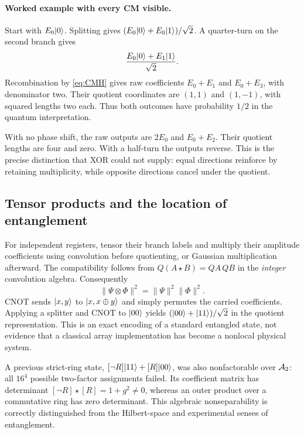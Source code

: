 \paragraph{Worked example with every CM visible.}
Start with $E_0\lvert 0\rangle$. Splitting gives $(E_0\lvert 0\rangle+E_0\lvert 1\rangle)/\sqrt2$. A quarter-turn on the second branch gives
\begin{equation}
 \frac{E_0\lvert 0\rangle+E_1\lvert 1\rangle}{\sqrt2}.
\end{equation}
Recombination by \cref{eq:CMH} gives raw coefficients $E_0+E_1$ and $E_0+E_3$, with denominator two. Their quotient coordinates are $(1,1)$ and $(1,-1)$, with squared lengths two each. Thus both outcomes have probability $1/2$ in the quantum interpretation.

With no phase shift, the raw outputs are $2E_0$ and $E_0+E_2$. Their quotient lengths are four and zero. With a half-turn the outputs reverse. This is the precise distinction that XOR could not supply: equal directions reinforce by retaining multiplicity, while opposite directions cancel under the quotient.

\subsection{Tensor products and the location of entanglement}
For independent registers, tensor their branch labels and multiply their amplitude coefficients using convolution before quotienting, or Gaussian multiplication afterward. The compatibility follows from $Q(A\star B)=QA\,QB$ in the \emph{integer} convolution algebra. Consequently
\begin{equation}
 \|\Psi\otimes\Phi\|^2=\|\Psi\|^2\|\Phi\|^2.
\end{equation}
CNOT sends $\lvert x,y\rangle$ to $\lvert x,x\oplus y\rangle$ and simply permutes the carried coefficients. Applying a splitter and CNOT to $\lvert 00\rangle$ yields $(\lvert 00\rangle+\lvert 11\rangle)/\sqrt2$ in the quotient representation. This is an exact encoding of a standard entangled state, not evidence that a classical array implementation has become a nonlocal physical system.

A previous strict-ring state, $[\neg R]\lvert 11\rangle+[R]\lvert 00\rangle$, was also nonfactorable over $\mathcal A_2$: all $16^4$ possible two-factor assignments failed. Its coefficient matrix has determinant $[\neg R]\star[R]=1+g^2\ne0$, whereas an outer product over a commutative ring has zero determinant. This algebraic nonseparability is correctly distinguished from the Hilbert-space and experimental senses of entanglement.

